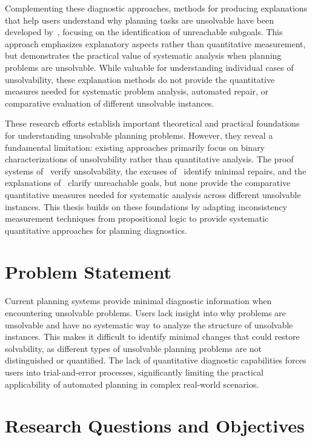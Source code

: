 \documentclass[proposal,english,palatino]{AIGpaper}
\begin{document}
Complementing these diagnostic approaches, methods for producing explanations that help users understand why planning tasks are unsolvable have been developed by~\cite{Sreedharan2019}, focusing on the identification of unreachable subgoals. This approach emphasizes explanatory aspects rather than quantitative measurement, but demonstrates the practical value of systematic analysis when planning problems are unsolvable. While valuable for understanding individual cases of unsolvability, these explanation methods do not provide the quantitative measures needed for systematic problem analysis, automated repair, or comparative evaluation of different unsolvable instances.

These research efforts establish important theoretical and practical foundations for understanding unsolvable planning problems. However, they reveal a fundamental limitation: existing approaches primarily focus on binary characterizations of unsolvability rather than quantitative analysis. The proof systems of~\cite{Eriksson2018} verify unsolvability, the excuses of~\cite{Goebelbecker2010} identify minimal repairs, and the explanations of~\cite{Sreedharan2019} clarify unreachable goals, but none provide the comparative quantitative measures needed for systematic analysis across different unsolvable instances. This thesis builds on these foundations by adapting inconsistency measurement techniques from propositional logic to provide systematic quantitative approaches for planning diagnostics.

\section{Problem Statement}

Current planning systems provide minimal diagnostic information when encountering unsolvable problems. Users lack insight into why problems are unsolvable and have no systematic way to analyze the structure of unsolvable instances. This makes it difficult to identify minimal changes that could restore solvability, as different types of unsolvable planning problems are not distinguished or quantified. The lack of quantitative diagnostic capabilities forces users into trial-and-error processes, significantly limiting the practical applicability of automated planning in complex real-world scenarios.

\section{Research Questions and Objectives}
\end{document}
